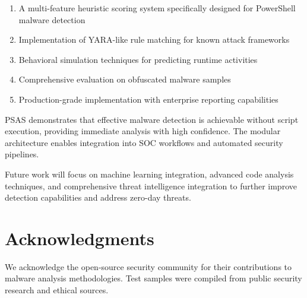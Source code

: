 \documentclass[10pt,conference,a4paper]{IEEEtran}
\begin{document}
\begin{enumerate}
\item A multi-feature heuristic scoring system specifically designed for PowerShell malware detection
\item Implementation of YARA-like rule matching for known attack frameworks
\item Behavioral simulation techniques for predicting runtime activities
\item Comprehensive evaluation on obfuscated malware samples
\item Production-grade implementation with enterprise reporting capabilities
\end{enumerate}

PSAS demonstrates that effective malware detection is achievable without script execution, providing immediate analysis with high confidence. The modular architecture enables integration into SOC workflows and automated security pipelines.

Future work will focus on machine learning integration, advanced code analysis techniques, and comprehensive threat intelligence integration to further improve detection capabilities and address zero-day threats.

\section*{Acknowledgments}

We acknowledge the open-source security community for their contributions to malware analysis methodologies. Test samples were compiled from public security research and ethical sources.
\end{document}
